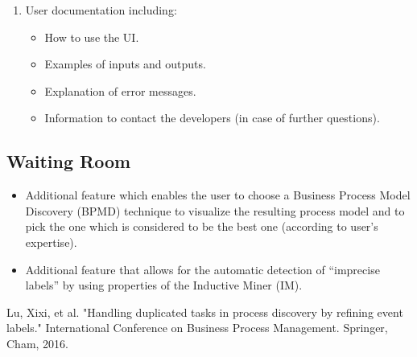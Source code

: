 \documentclass[notitlepage]{article}
\begin{document}
\begin{flushleft}
\begin{enumerate}
\item User documentation including:
\begin{itemize}
\item How to use the UI. 
\item Examples of inputs and outputs.
\item Explanation of error messages.
\item Information to contact the developers (in case of further questions).
\end{itemize}
\end{enumerate}

\subsection{Waiting Room}

\begin{itemize}
\item Additional feature which enables the user to choose a Business Process Model Discovery (BPMD) technique to visualize the resulting process model and to pick the one which is considered to be the best one (according to user’s expertise). 
\item Additional feature that allows for the automatic detection of “imprecise labels” by using properties of the Inductive Miner (IM).
\end{itemize}





\end{flushleft}
%



\begin{thebibliography}{5}
Lu, Xixi, et al. "Handling duplicated tasks in process discovery by refining event labels." International Conference on Business Process Management. Springer, Cham, 2016.










\end{thebibliography}
\end{document}
